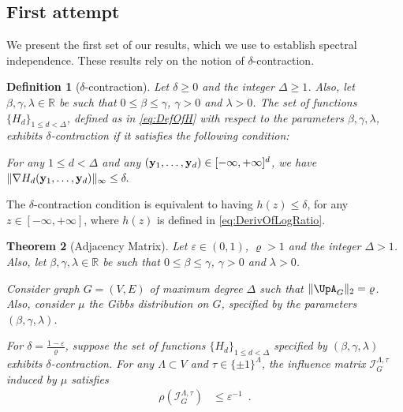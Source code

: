 \documentclass[11pt,reqno]{amsart}
\numberwithin{equation}{section}
\newtheorem{theorem}{Theorem}[section]
\newtheorem{definition}[theorem]{Definition}
\newcommand{\cI}{{\mathcal{I}}}
\newcommand{\cadmiumgreen}[1]{{\color{cadmiumgreen}#1}}
\newcommand{\cadmiumorange}[1]{{\color{cadmiumorange}#1}}
\newcommand{\goldenbrown}[1]{{\color{goldenbrown}#1}}
\newcommand{\maxDeg}{{\Delta}}
\newcommand{\logtrecur}{H}
\newcommand{\dlogtrecur}{h}
\newcommand{\infmatrix}{\cI}
\newcommand{\spradius}{{\rho}}
\newcommand{\norm}[2]{\goldenbrown{\|} #1 \goldenbrown{\|}_{#2}}
\newcommand{\Adjacency}{{\UpA}}
\newcommand{\aspradius}{{\varrho}}
\renewcommand{\cadmiumgreen}[1]{#1}
\renewcommand{\cadmiumorange}[1]{#1}
\renewcommand{\goldenbrown}[1]{#1}
\newcommand{\kd}{\goldenbrown{d}}
\newcommand{\ky}{\cadmiumorange{y}}%
\newcommand{\kz}{\cadmiumgreen{z}}
\renewcommand{\kd}{d}
\renewcommand{\ky}{\cadmiumgreen{y}}
\renewcommand{\kz}{z}
\begin{document}
 



\subsection{First attempt}\label{sec:SIFirstAttempt}
% 
We present the first set of our results, which we use to establish spectral independence. These results rely on the notion of 
$\delta$-contraction. 



\begin{definition}[$ \delta$-contraction]\label{def:HContraction}
Let $\delta\geq 0$ and the integer $\maxDeg\geq 1$. Also, let $\beta,\gamma, \lambda\in \mathbb{R}$ be
such that $0\leq \beta\leq \gamma$, 
$\gamma >0$ and $\lambda>0$. 
%
The set of functions $\{ \logtrecur_d\}_{1\leq \kd <\maxDeg}$, defined as in \eqref{eq:DefOfH}
with respect to the parameters $\beta,\gamma,\lambda$,
exhibits {\em $\delta$-contraction } if it satisfies the following condition: 

For any $1\leq \kd < \maxDeg$ and any $({\bf \ky}_1, \ldots, {\bf \ky}_{\kd})\in [-\infty,+\infty]^{\kd}$, we have 
$\norm{\nabla \logtrecur_{\kd} ({\bf \ky}_1, \ldots, {\bf \ky}_{\kd})}{\infty} \leq \delta.$
\end{definition}

The $\delta$-contraction condition is equivalent to having $\dlogtrecur(\kz)\leq \delta$, for any $\kz\in [-\infty,+\infty]$, where 
$\dlogtrecur(\kz)$ is defined in \eqref{eq:DerivOfLogRatio}.




\begin{theorem}[Adjacency Matrix] \label{thrm:AdjacencyInfinityMixing}
Let $\varepsilon\in (0,1)$, $\aspradius > 1$ and the integer $\maxDeg > 1$. Also, let $\beta,\gamma, \lambda\in \mathbb{R}$ 
be such that $0\leq \beta\leq \gamma$, $\gamma >0$ and $\lambda>0$. 

Consider graph $G=(V,E)$ of maximum degree $\maxDeg$ such that   $\norm{\Adjacency_G}{2}=\aspradius$. 
 Also, consider $\mu$ the Gibbs distribution on $G$, specified by the parameters $(\beta, \gamma, \lambda)$. 



For $\delta =\frac{1-\varepsilon}{\aspradius}$, suppose  the set of functions  $\{ \logtrecur_{\kd}\}_{1\leq \kd< \maxDeg}$ 
specified by $(\beta,\gamma,\lambda)$ exhibits $\delta$-contraction. For any  $\Lambda\subset V$ and 
$\tau\in \{\pm 1\}^{\Lambda}$, the influence matrix  $\infmatrix^{\Lambda,\tau}_{G}$ induced by $\mu$ satisfies 
\begin{align}\nonumber 
\textstyle \spradius \left( \infmatrix^{\Lambda,\tau}_{G} \right) &\leq \varepsilon^{-1} \enspace.
\end{align}
\end{theorem}
\end{document}
